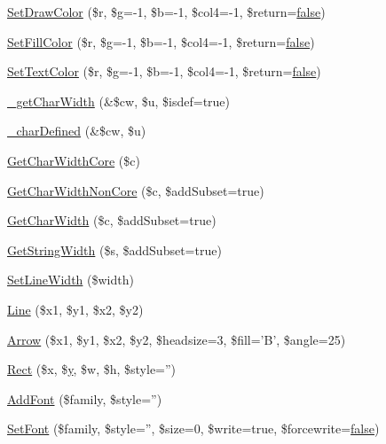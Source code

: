 \begin{DoxyCompactItemize}
\item 
\hyperlink{classm_p_d_f_a4126aa1eb9573ce3fb4d6b0ee45ad7c9}{Set\-Draw\-Color} (\$r, \$g=-\/1, \$b=-\/1, \$col4=-\/1, \$return=\hyperlink{ttfontsuni_8php_afbaa04e5cc97693dc668b3c45d3dd740}{false})
\item 
\hyperlink{classm_p_d_f_a5cc34587d32fce7aff3c7222d3c372c8}{Set\-Fill\-Color} (\$r, \$g=-\/1, \$b=-\/1, \$col4=-\/1, \$return=\hyperlink{ttfontsuni_8php_afbaa04e5cc97693dc668b3c45d3dd740}{false})
\item 
\hyperlink{classm_p_d_f_a81bd995c757a2a4c582ed752236231b2}{Set\-Text\-Color} (\$r, \$g=-\/1, \$b=-\/1, \$col4=-\/1, \$return=\hyperlink{ttfontsuni_8php_afbaa04e5cc97693dc668b3c45d3dd740}{false})
\item 
\hyperlink{classm_p_d_f_a9b1ba3a0bce91b5a035a5e2083822875}{\-\_\-get\-Char\-Width} (\&\$cw, \$u, \$isdef=true)
\item 
\hyperlink{classm_p_d_f_acb07e0743f4af22ce8b5e5b78695520e}{\-\_\-char\-Defined} (\&\$cw, \$u)
\item 
\hyperlink{classm_p_d_f_a4e12801ef66e973c0f4a65840f16230b}{Get\-Char\-Width\-Core} (\$c)
\item 
\hyperlink{classm_p_d_f_a8f1d772f8a92a31475861ba08736ba92}{Get\-Char\-Width\-Non\-Core} (\$c, \$add\-Subset=true)
\item 
\hyperlink{classm_p_d_f_af7ed44b2b73d7bf2a0028247d7b31e4c}{Get\-Char\-Width} (\$c, \$add\-Subset=true)
\item 
\hyperlink{classm_p_d_f_a801e2595d7d8c4da6fd57cd9f72aec88}{Get\-String\-Width} (\$s, \$add\-Subset=true)
\item 
\hyperlink{classm_p_d_f_ad49a933a8e50de828bcd1e895358717c}{Set\-Line\-Width} (\$width)
\item 
\hyperlink{classm_p_d_f_a35de684750588e5117812680c5a5391b}{Line} (\$x1, \$y1, \$x2, \$y2)
\item 
\hyperlink{classm_p_d_f_a4efab169d13a968ff8f67bfb7f88d275}{Arrow} (\$x1, \$y1, \$x2, \$y2, \$headsize=3, \$fill='B', \$angle=25)
\item 
\hyperlink{classm_p_d_f_adf868bb87dd2d8c6f95506eb86eae99f}{Rect} (\$x, \$\hyperlink{example43___m_p_d_f_i__booklet_8php_a3f83be162d14f38451e1bc419fbbbcbc}{y}, \$w, \$h, \$style='')
\item 
\hyperlink{classm_p_d_f_a96fb52cf97d2f1980c7c9666acb45ce7}{Add\-Font} (\$family, \$style='')
\item 
\hyperlink{classm_p_d_f_a929b17173c04ae134a5b53b08a93bdef}{Set\-Font} (\$family, \$style='', \$size=0, \$write=true, \$forcewrite=\hyperlink{ttfontsuni_8php_afbaa04e5cc97693dc668b3c45d3dd740}{false})

\end{DoxyCompactItemize}
